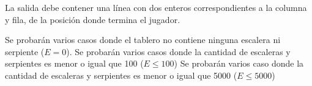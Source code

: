 \documentclass{oci}
\begin{document}
\begin{outputDescription}
  La salida debe contener una línea con dos enteros correspondientes a la
  columna y fila, de la posición donde termina el jugador.
\end{outputDescription}

\begin{scoreDescription}
   Se probarán varios casos donde el tablero no contiene ninguna
  escalera ni serpiente ($E = 0$).
   Se probarán varios casos donde la cantidad de escaleras y
  serpientes es menor o igual que 100 ($E \leq 100$)
   Se probarán varios caso donde la cantidad de escaleras y serpientes
  es menor o igual que 5000 ($E \leq 5000$)
\end{scoreDescription}

\begin{sampleDescription}
\end{sampleDescription}
\end{document}
